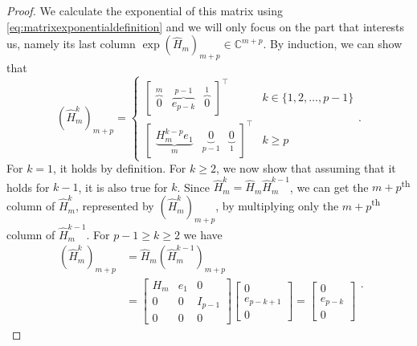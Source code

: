 \begin{proof}
We calculate the exponential of this matrix using \autoref{eq:matrixexponentialdefinition}
and we will only focus on the part that interests us, namely its last column
$\exp(\hat{H}_m)_{m+p} \in \mathbb{C}^{m+p}$. By induction, we can show that
\begin{equation}
    \label{eq:hhatpowered}
    (\hat{H}_m^k)_{m+p} =
    \begin{cases}
        \begin{bmatrix}
            \overset{m}{\overbrace{0}} &
            \overset{p-1}{\overbrace{e_{p-k}}} & \overset{1}{\overbrace{0}}
        \end{bmatrix}^\top & k \in \{ 1, 2, \dots, p-1 \}
        \\
        \begin{bmatrix}
            \underset{m}{\underbrace{H_m^{k-p} e_1}} &
            \underset{p-1}{\underbrace{0}} & \underset{1}{\underbrace{0}}
        \end{bmatrix}^\top & k \ge p
    \end{cases}.
\end{equation}
For $k=1$, it holds by definition. For $k \ge 2$, we now show that assuming that it holds for $k-1$, it is also
true for $k$. Since $\hat{H}_m^k = \hat{H}_m \hat{H}_m^{k-1}$, we can get the $m+p$\textsuperscript{th} column
of $\hat{H}_m^k$, represented by $(\hat{H}_m^k)_{m+p}$, by multiplying only the $m+p$\textsuperscript{th}
column of $\hat{H}_m^{k-1}$. For $p-1 \ge k \ge 2$ we have
\begin{equation}
    \begin{aligned}
        (\hat{H}_m^k)_{m+p} & = \hat{H}_m (\hat{H}_m^{k-1})_{m+p} \\
        & =
        \begin{bmatrix} H_m & e_1 & 0\\ 0 & 0 & I_{p-1}\\ 0 & 0 & 0 \end{bmatrix}
        \begin{bmatrix} 0 \\ e_{p-k+1} \\ 0 \end{bmatrix}
        =
        \begin{bmatrix} 0 \\ e_{p-k} \\ 0 \end{bmatrix}
    \end{aligned}.
\end{equation}

\end{proof}
